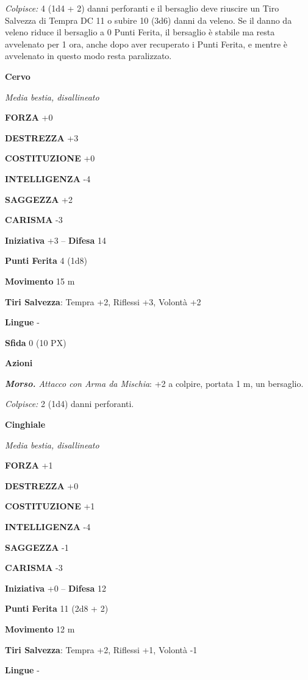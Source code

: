 \begin{multicols}{2}
\textit{Colpisce:} 4 (1d4 + 2) danni perforanti e il bersaglio deve riuscire un Tiro Salvezza di Tempra DC 11 o subire 10 (3d6) danni da veleno. Se il danno da veleno riduce il bersaglio a 0 Punti Ferita, il bersaglio è stabile ma resta avvelenato per 1 ora, anche dopo aver recuperato i Punti Ferita, e mentre è avvelenato in questo modo resta paralizzato.

\medskip\textbf{Cervo}

\textit{Media bestia, disallineato}

\textbf{FORZA} +0

\textbf{DESTREZZA} +3

\textbf{COSTITUZIONE} +0

\textbf{INTELLIGENZA} -4

\textbf{SAGGEZZA} +2

\textbf{CARISMA} -3

\textbf{Iniziativa} +3 -- \textbf{Difesa} 14

\textbf{Punti Ferita} 4 (1d8)

\textbf{Movimento} 15 m

\textbf{Tiri Salvezza}: Tempra +2, Riflessi +3, Volontà +2

\textbf{Lingue} -

\textbf{Sfida} 0 (10 PX)

\textbf{Azioni}

\textit{\textbf{Morso.} Attacco con Arma da Mischia}: +2 a colpire, portata 1 m, un bersaglio.

\textit{Colpisce:} 2 (1d4) danni perforanti.

\medskip\textbf{Cinghiale}

\textit{Media bestia, disallineato}

\textbf{FORZA} +1

\textbf{DESTREZZA} +0

\textbf{COSTITUZIONE} +1

\textbf{INTELLIGENZA} -4

\textbf{SAGGEZZA} -1

\textbf{CARISMA} -3

\textbf{Iniziativa} +0 -- \textbf{Difesa} 12

\textbf{Punti Ferita} 11 (2d8 + 2)

\textbf{Movimento} 12 m

\textbf{Tiri Salvezza}: Tempra +2, Riflessi +1, Volontà -1

\textbf{Lingue} -


\end{multicols}
